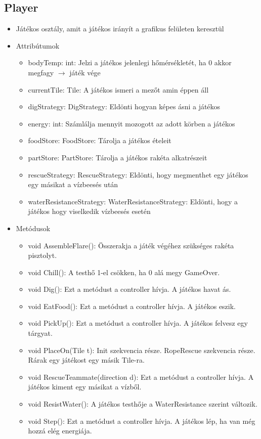 \subsection{Player}
\begin{itemize}
	\item Játékos osztály, amit a játékos irányít a grafikus felületen keresztül\\

\item Attribútumok
\begin{itemize}
	\item bodyTemp: int: Jelzi a játékos jelenlegi hőmérsékletét, ha 0 akkor megfagy $\rightarrow$ játék vége
	\item currentTile: Tile: A játékos ismeri a mezőt amin éppen áll
	\item digStrategy: DigStrategy: Eldönti hogyan képes ásni a játékos
	\item energy: int: Számlálja mennyit mozogott az adott körben a játékos
	\item foodStore: FoodStore: Tárolja a játékos ételeit
	\item partStore: PartStore: Tárolja a játékos rakéta alkatrészeit
	\item rescueStrategy: RescueStrategy: Eldönti, hogy megmenthet egy játékos egy másikat a vízbeesés után
	\item waterResistanceStrategy: WaterResistanceStrategy: Eldönti, hogy a játékos hogy viselkedik vízbeesés esetén
\end{itemize}
\item Metódusok
\begin{itemize}
	\item void AssembleFlare(): Összerakja a játék végéhez szükséges rakéta pisztolyt.
	\item void Chill(): A testhő 1-el csökken, ha 0 alá megy GameOver.
	\item void Dig(): Ezt a metódust a controller hívja. A játékos havat ás.
	\item void EatFood(): Ezt a metódust a controller hívja. A játékos eszik.
	\item void PickUp(): Ezt a metódust a controller hívja. A játékos felvesz egy tárgyat.
	\item void PlaceOn(Tile t): Init szekvencia része. RopeRescue szekvencia része. Rárak egy játékost egy másik Tile-ra.
	\item void RescueTeammate(direction d): Ezt a metódust a controller hívja. A játékos kiment egy másikat a vízből.
	\item void ResistWater(): A játékos testhője a WaterResistance szerint változik.
	\item void Step(): Ezt a metódust a controller hívja. A játékos lép, ha van még hozzá elég energiája.
\end{itemize}
\end{itemize}


